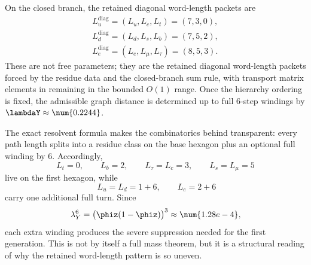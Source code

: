 On the closed branch, the retained diagonal word-length packets are
\begin{equation}
\label{eq:minimal-word-lengths}
\begin{gathered}
L_u^{\mathrm{diag}}=(L_u,L_c,L_t)=(7,3,0),\\
L_d^{\mathrm{diag}}=(L_d,L_s,L_b)=(7,5,2),\\
L_e^{\mathrm{diag}}=(L_e,L_\mu,L_\tau)=(8,5,3).
\end{gathered}
\end{equation}
These are not free parameters; they are the retained diagonal word-length packets forced by the
residue data and the closed-branch sum rule, with transport matrix elements in
 remaining in the bounded $O(1)$ range. Once the hierarchy ordering is
fixed, the admissible graph distance is determined up to full $6$-step windings by
$\lambdaY\approx\num{0.2244}$.

\begin{remark}
The exact resolvent formula  makes the combinatorics behind  transparent: every path length splits into a residue class on the base hexagon plus an optional full winding by $6$. Accordingly,
\[
L_t=0,\qquad
L_b=2,\qquad
L_\tau=L_c=3,\qquad
L_s=L_\mu=5
\]
live on the first hexagon, while
\[
\;L_u=L_d=1+6,
\qquad
L_e=2+6
\]
carry one additional full turn. Since
\[
\lambda_Y^6=\bigl(\phiz(1-\phiz)\bigr)^3\approx \num{1.28e-4},
\]
each extra winding produces the severe suppression needed for the first generation. This is not by itself a full mass theorem, but it is a structural reading of why the retained word-length pattern is so uneven.
\end{remark}
